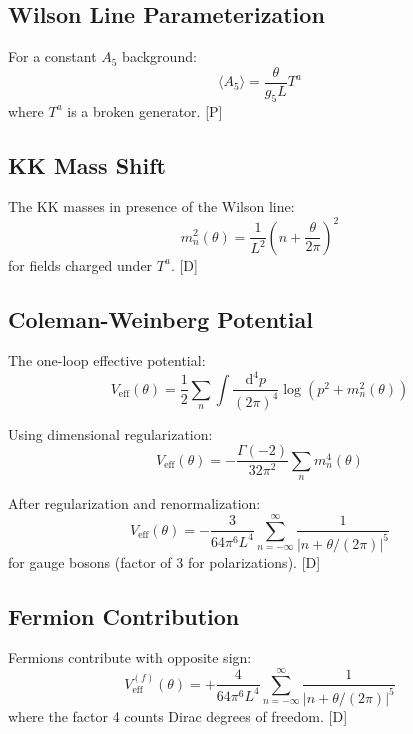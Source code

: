\documentclass[11pt,a4paper]{article}
\newcommand{\dd}{\mathrm{d}}
\begin{document}
\subsection{Wilson Line Parameterization}

For a constant $A_5$ background:
\begin{equation}
\langle A_5 \rangle = \frac{\theta}{g_5 L} T^a
\label{eq:wilson-param}
\end{equation}
where $T^a$ is a broken generator. [P]

\subsection{KK Mass Shift}

The KK masses in presence of the Wilson line:
\begin{equation}
m_n^2(\theta) = \frac{1}{L^2}\left(n + \frac{\theta}{2\pi}\right)^2
\label{eq:kk-mass-shifted}
\end{equation}
for fields charged under $T^a$. [D]

\subsection{Coleman-Weinberg Potential}

The one-loop effective potential:
\begin{equation}
V_{\text{eff}}(\theta) = \frac{1}{2}\sum_n \int\frac{\dd^4p}{(2\pi)^4}\log(p^2 + m_n^2(\theta))
\label{eq:cw-integral}
\end{equation}

Using dimensional regularization:
\begin{equation}
V_{\text{eff}}(\theta) = -\frac{\Gamma(-2)}{32\pi^2}\sum_n m_n^4(\theta)
\label{eq:cw-regulated}
\end{equation}

After regularization and renormalization:
\begin{equation}
V_{\text{eff}}(\theta) = -\frac{3}{64\pi^6 L^4}\sum_{n=-\infty}^{\infty}\frac{1}{|n + \theta/(2\pi)|^5}
\label{eq:cw-final}
\end{equation}
for gauge bosons (factor of 3 for polarizations). [D]

\subsection{Fermion Contribution}

Fermions contribute with opposite sign:
\begin{equation}
V_{\text{eff}}^{(f)}(\theta) = +\frac{4}{64\pi^6 L^4}\sum_{n=-\infty}^{\infty}\frac{1}{|n + \theta/(2\pi)|^5}
\label{eq:cw-fermion}
\end{equation}
where the factor 4 counts Dirac degrees of freedom. [D]
\end{document}
